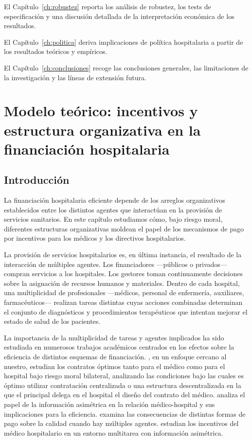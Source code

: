\documentclass[12pt, a4paper, twoside, openright]{book}
\theoremstyle{plain}
\theoremstyle{definition}
\theoremstyle{remark}
\begin{document}
El Capítulo~\ref{ch:robustez} reporta los análisis de robustez, los tests de especificación y una discusión detallada de la interpretación económica de los resultados.

El Capítulo~\ref{ch:politica} deriva implicaciones de política hospitalaria a partir de los resultados teóricos y empíricos.

El Capítulo~\ref{ch:conclusiones} recoge las conclusiones generales, las limitaciones de la investigación y las líneas de extensión futura.



\chapter{Modelo teórico: incentivos y estructura organizativa en la financiación hospitalaria}
\label{ch:modelo}

\section{Introducción}

La financiación hospitalaria eficiente depende de los arreglos organizativos establecidos entre los distintos agentes que interactúan en la provisión de servicios sanitarios. En este capítulo estudiamos cómo, bajo riesgo moral, diferentes estructuras organizativas moldean el papel de los mecanismos de pago por incentivos para los médicos y los directivos hospitalarios.

La provisión de servicios hospitalarios es, en última instancia, el resultado de la interacción de múltiples agentes. Los financiadores ---públicos o privados--- compran servicios a los hospitales. Los gestores toman continuamente decisiones sobre la asignación de recursos humanos y materiales. Dentro de cada hospital, una multiplicidad de profesionales ---médicos, personal de enfermería, auxiliares, farmacéuticos--- realizan tareas distintas cuyas acciones combinadas determinan el conjunto de diagnósticos y procedimientos terapéuticos que intentan mejorar el estado de salud de los pacientes.

La importancia de la multiplicidad de tareas y agentes implicados ha sido estudiada en numerosos trabajos académicos centrados en los efectos sobre la eficiencia de distintos esquemas de financiación. \citet{jelovac2002}, en un enfoque cercano al nuestro, estudian los contratos óptimos tanto para el médico como para el hospital bajo riesgo moral bilateral, analizando las condiciones bajo las cuales es óptimo utilizar contratación centralizada o una estructura descentralizada en la que el principal delega en el hospital el diseño del contrato del médico. \citet{ma1997} analiza el papel de la información asimétrica en la relación médico-hospital y sus implicaciones para la eficiencia. \citet{eggleston2005} examina las consecuencias de distintas formas de pago sobre la calidad cuando hay múltiples agentes. \citet{kaarboe2011} estudian los incentivos del médico hospitalario en un entorno multitarea con información asimétrica.
\end{document}
